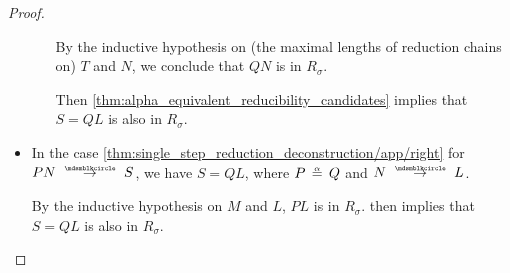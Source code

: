 \begin{proof}
\begin{itemize}
\begin{itemize}
      By the inductive hypothesis on (the maximal lengths of reduction chains on) \( T \) and \( N \), we conclude that \( Q N \) is in \( R_\sigma \).

      Then \cref{thm:alpha_equivalent_reducibility_candidates} implies that \( S = Q L \) is also in \( R_\sigma \).
    \end{itemize}

    \item In the case \cref{thm:single_step_reduction_deconstruction/app/right} for \( P N \pred S \), we have \( S = Q L \), where \( P \aequiv Q \) and \( N \pred L \).

    By the inductive hypothesis on \( M \) and \( L \), \( P L \) is in \( R_\sigma \).  then implies that \( S = Q L \) is also in \( R_\sigma \).
  \end{itemize}
\end{proof}

